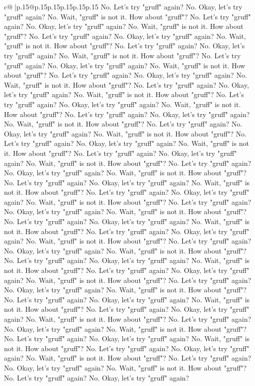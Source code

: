 \documentclass{article}
\begin{document}
{\begin{supertabular}{c@{$\;$}|p{.15\linewidth}@{}p{.15\linewidth}p{.15\linewidth}p{.15\linewidth}p{.15\linewidth}p{.15\linewidth}}
{{{No. Let's try "gruff" again? No. Okay, let's try "gruff" again? No. Wait, "gruff" is not it. How about "gruff"? No. Let's try "gruff" again? No. Okay, let's try "gruff" again? No. Wait, "gruff" is not it. How about "gruff"? No. Let's try "gruff" again? No. Okay, let's try "gruff" again? No. Wait, "gruff" is not it. How about "gruff"? No. Let's try "gruff" again? No. Okay, let's try "gruff" again? No. Wait, "gruff" is not it. How about "gruff"? No. Let's try "gruff" again? No. Okay, let's try "gruff" again? No. Wait, "gruff" is not it. How about "gruff"? No. Let's try "gruff" again? No. Okay, let's try "gruff" again? No. Wait, "gruff" is not it. How about "gruff"? No. Let's try "gruff" again? No. Okay, let's try "gruff" again? No. Wait, "gruff" is not it. How about "gruff"? No. Let's try "gruff" again? No. Okay, let's try "gruff" again? No. Wait, "gruff" is not it. How about "gruff"? No. Let's try "gruff" again? No. Okay, let's try "gruff" again? No. Wait, "gruff" is not it. How about "gruff"? No. Let's try "gruff" again? No. Okay, let's try "gruff" again? No. Wait, "gruff" is not it. How about "gruff"? No. Let's try "gruff" again? No. Okay, let's try "gruff" again? No. Wait, "gruff" is not it. How about "gruff"? No. Let's try "gruff" again? No. Okay, let's try "gruff" again? No. Wait, "gruff" is not it. How about "gruff"? No. Let's try "gruff" again? No. Okay, let's try "gruff" again? No. Wait, "gruff" is not it. How about "gruff"? No. Let's try "gruff" again? No. Okay, let's try "gruff" again? No. Wait, "gruff" is not it. How about "gruff"? No. Let's try "gruff" again? No. Okay, let's try "gruff" again? No. Wait, "gruff" is not it. How about "gruff"? No. Let's try "gruff" again? No. Okay, let's try "gruff" again? No. Wait, "gruff" is not it. How about "gruff"? No. Let's try "gruff" again? No. Okay, let's try "gruff" again? No. Wait, "gruff" is not it. How about "gruff"? No. Let's try "gruff" again? No. Okay, let's try "gruff" again? No. Wait, "gruff" is not it. How about "gruff"? No. Let's try "gruff" again? No. Okay, let's try "gruff" again? No. Wait, "gruff" is not it. How about "gruff"? No. Let's try "gruff" again? No. Okay, let's try "gruff" again? No. Wait, "gruff" is not it. How about "gruff"? No. Let's try "gruff" again? No. Okay, let's try "gruff" again? No. Wait, "gruff" is not it. How about "gruff"? No. Let's try "gruff" again? No. Okay, let's try "gruff" again? No. Wait, "gruff" is not it. How about "gruff"? No. Let's try "gruff" again? No. Okay, let's try "gruff" again? No. Wait, "gruff" is not it. How about "gruff"? No. Let's try "gruff" again? No. Okay, let's try "gruff" again? No. Wait, "gruff" is not it. How about "gruff"? No. Let's try "gruff" again? No. Okay, let's try "gruff" again? No. Wait, "gruff" is not it. How about "gruff"? No. Let's try "gruff" again? No. Okay, let's try "gruff" again? No. Wait, "gruff" is not it. How about "gruff"? No. Let's try "gruff" again? No. Okay, let's try "gruff" again? No. Wait, "gruff" is not it. How about "gruff"? No. Let's try "gruff" again? No. Okay, let's try "gruff" again? No. Wait, "gruff" is not it. How about "gruff"? No. Let's try "gruff" again? No. Okay, let's try "gruff" again? }}}
\end{supertabular}}
\end{document}
